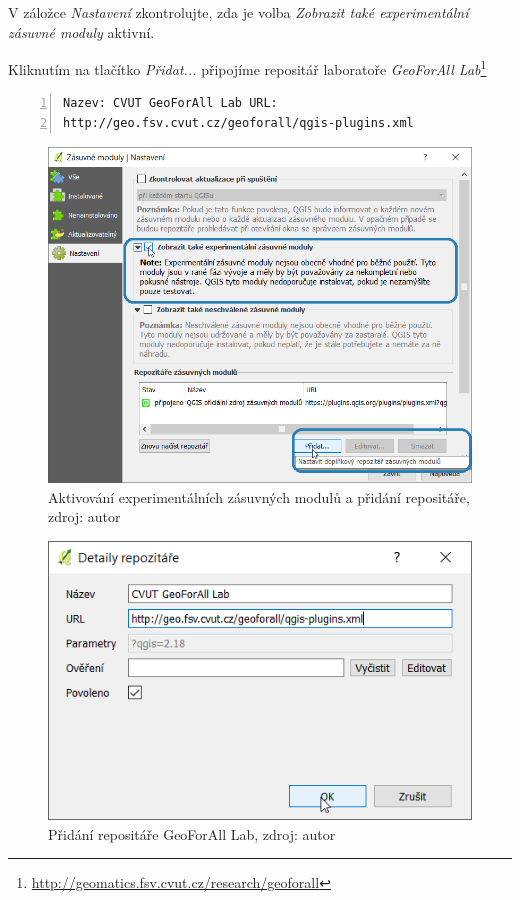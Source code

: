 V záložce \textit{Nastavení} zkontrolujte, zda je volba
\textit{Zobrazit také experimentální zásuvné moduly} aktivní.

Kliknutím na tlačítko \textit{Přidat...} připojíme repositář
laboratoře \textit{GeoForAll
Lab}\footnote{\url{http://geomatics.fsv.cvut.cz/research/geoforall}}

\begin{lstlisting}[basicstyle=\footnotesize\ttfamily, backgroundcolor
= \color{light-gray}, numbers=left, columns=fullflexible,
keepspaces=true] Nazev: CVUT GeoForAll Lab URL:
http://geo.fsv.cvut.cz/geoforall/qgis-plugins.xml
\end{lstlisting}

	\begin{figure}[H] \centering
		\includegraphics[width=.85\textwidth]{./pictures/pridani_repositare.png}
		\caption[Aktivování experimentálních zásuvných modulů
a přidání repositáře.]{Aktivování experimentálních zásuvných modulů a
přidání repositáře, zdroj: autor}
		\label{manual_pridani_repozitare}
 	\end{figure}
 	
	\begin{figure}[H] \centering
		\includegraphics[width=.6\textwidth]{./pictures/zadani_repositare.png}
		\caption[Přidání repositáře GeoForAll Lab]{Přidání
repositáře GeoForAll Lab, zdroj: autor}
		\label{manual_zadani_repozitare_geoforall_lab}
 	\end{figure}

